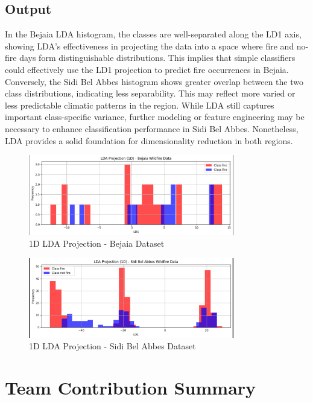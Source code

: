 \documentclass[12pt]{article}
\begin{document}
\subsection*{Output}
In the Bejaia LDA histogram, the classes are well-separated along the LD1 axis, showing LDA's effectiveness in projecting the data into a space where fire and no-fire days form distinguishable distributions. This implies that simple classifiers could effectively use the LD1 projection to predict fire occurrences in Bejaia. Conversely, the Sidi Bel Abbes histogram shows greater overlap between the two class distributions, indicating less separability. This may reflect more varied or less predictable climatic patterns in the region. While LDA still captures important class-specific variance, further modeling or feature engineering may be necessary to enhance classification performance in Sidi Bel Abbes. Nonetheless, LDA provides a solid foundation for dimensionality reduction in both regions.

\begin{figure}
    \centering
    \includegraphics[width=0.8\textwidth]{images/svd_pca_lda/LDA1.png}
    \caption{1D LDA Projection - Bejaia Dataset}
\end{figure}

\begin{figure}
    \centering
    \includegraphics[width=0.8\textwidth]{images/svd_pca_lda/LDA2.png}
    \caption{1D LDA Projection - Sidi Bel Abbes Dataset}
\end{figure}

\newpage
\section*{Team Contribution Summary}
\end{document}
